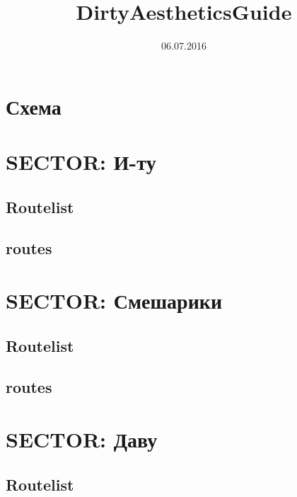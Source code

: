 \documentclass[8pt, a4paper,notitlepage,openany]{report}
\begin{document}
\title{DirtyAestheticsGuide}
\date{06.07.2016}
\tableofcontents
\pagestyle{fancy}






\chapter{Схема}
 \begin{figure}[h] 
\end{figure}





\chapter{SECTOR: И-ту}
\section*{Routelist}

\newpage
\section*{routes}


\chapter{SECTOR: Смешарики}
\section*{Routelist}

\newpage
\section*{routes}



\chapter{SECTOR: Даву}
\section*{Routelist}

\newpage
\end{document}

